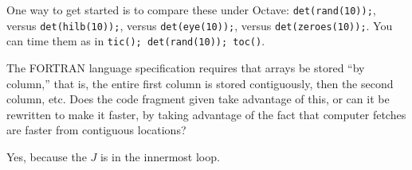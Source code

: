 \begin{exercises}
\begin{answer}
      One way to get started is to compare these under Octave:
      \texttt{det(rand(10));}, versus
      \texttt{det(hilb(10));}, versus
      \texttt{det(eye(10));}, versus
      \texttt{det(zeroes(10));}. 
      You can time them as in \texttt{tic(); det(rand(10)); toc()}.
    \end{answer}
  \item The \textsc{FORTRAN} language specification requires that arrays be
    stored ``by column,'' that is, the entire first column is stored
    contiguously, then the second column, etc.
    Does the code fragment given take advantage of this,
    or can it be rewritten to make it faster, by taking advantage of
    the fact that computer fetches are faster from contiguous locations?
    \begin{answer}
      Yes, because the $J$ is in the innermost loop.
    \end{answer}
\end{exercises}
\endinput
